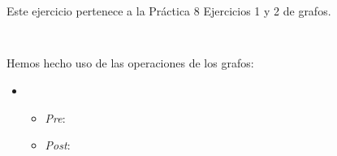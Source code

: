 \textbf{}\textit{}

\begin{quoting}
  Este ejercicio pertenece a la Práctica 8 Ejercicios 1 y 2 de grafos.
\end{quoting}

\begin{verbatim}
  
\end{verbatim}


Hemos hecho uso de las operaciones de los grafos:
\begin{itemize}
  \item \verb | |
  \begin{itemize}
    \item \textit{Pre}:
    \item \textit{Post}:
  \end{itemize}
\end{itemize}